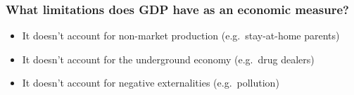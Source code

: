 \documentclass[
  letterpaper,
  DIV=11,
  numbers=noendperiod]{scrartcl}
\providecommand{\tightlist}{%
  \setlength{\itemsep}{0pt}\setlength{\parskip}{0pt}}\usepackage{longtable,booktabs,array}
\begin{document}
\hypertarget{what-limitations-does-gdp-have-as-an-economic-measure}{%
\subsubsection{What limitations does GDP have as an economic
measure?}\label{what-limitations-does-gdp-have-as-an-economic-measure}}

\begin{itemize}
\tightlist
\item
  It doesn't account for non-market production (e.g.~stay-at-home
  parents)
\item
  It doesn't account for the underground economy (e.g.~drug dealers)
\item
  It doesn't account for negative externalities (e.g.~pollution)
\end{itemize}
\end{document}
